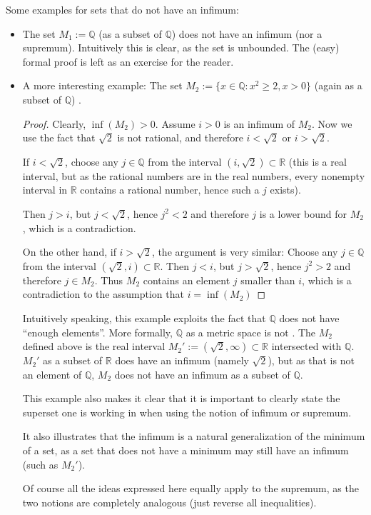 \documentclass[12pt]{article}
\begin{document}
Some examples for sets that do not have an infimum:

\begin{itemize}
\item The set $M_1:=\mathbb Q$ (as a subset of $\mathbb Q$) does not have
an infimum (nor a supremum).  Intuitively this is clear, as the set is
unbounded. The (easy) formal proof is left as an exercise for the reader.

\item A more interesting example: The set $M_2:=\{x \in \mathbb Q :
x^2\geq 2, x>0 \}$ (again as a subset of $\mathbb Q$) .
\begin{proof}
Clearly, $\inf(M_2)>0$. Assume $i>0$ is an infimum of $M_2$. Now we use
the fact that $\sqrt 2$ is not rational, and therefore $i<\sqrt 2$ or
$i>\sqrt 2$.

If $i<\sqrt 2$, choose any $j\in \mathbb Q$ from the interval $(i, \sqrt 2
) \subset \mathbb R$ (this is a real interval, but as the rational numbers
are  in the real numbers, every nonempty interval in $\mathbb R$
contains a rational number, hence such a $j$ exists).

Then $j>i$, but $j< \sqrt 2$, hence $j^2<2$ and therefore $j$ is a lower
bound for $M_2$, which is a contradiction.

On the other hand, if $i>\sqrt 2$, the argument is very similar:
Choose any $j\in \mathbb Q$ from the interval $(\sqrt 2, i) \subset
\mathbb R$. Then $j<i$, but $j> \sqrt 2$, hence $j^2>2$ and therefore
$j\in M_2$. Thus $M_2$ contains an element $j$ smaller than $i$, which is
a contradiction to the assumption that $i=\inf(M_2)$
\end{proof}

Intuitively speaking, this example exploits the fact that $\mathbb Q$ does
not have ``enough elements''. More formally, $\mathbb Q$ as a metric space
is not . The $M_2$ defined above is the real interval
$M_2':=(\sqrt 2, \infty)\subset \mathbb R$ intersected with $\mathbb Q$.
$M_2'$ as a subset of $\mathbb R$ does have an infimum (namely $\sqrt 2$),
but as that is not an element of $\mathbb Q$, $M_2$ does not have an
infimum as a subset of $\mathbb Q$.

This example also makes it clear that it is important to clearly state the
superset one is working in when using the notion of infimum or supremum.

It also illustrates that the infimum is a natural generalization of the
minimum of a set, as a set that does not have a minimum may still have
an infimum (such as $M_2'$).

Of course all the ideas expressed here equally apply to the supremum, as the
two notions are completely analogous (just reverse all inequalities).
\end{itemize}
\end{document}
